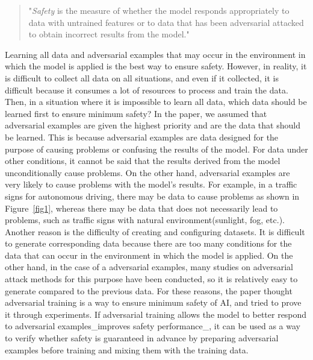 \documentclass[journal,article,submit,moreauthors,pdftex]{Definitions/mdpi}
\begin{document}
\begin{quote}
    "{\it Safety} is the measure of whether the model responds appropriately to data with untrained features or to data that has been adversarial attacked to obtain incorrect results from the model."
\end{quote}

Learning all data and adversarial examples that may occur in the environment in which the model is applied is the best way to ensure safety.
However, in reality, it is difficult to collect all data on all situations, and even if it collected, it is difficult because it consumes a lot of resources to process and train the data.
Then, in a situation where it is impossible to learn all data, which data should be learned first to ensure minimum safety?
In the paper, we assumed that adversarial examples are given the highest priority and are the data that should be learned.
This is because adversarial examples are data designed for the purpose of causing problems or confusing the results of the model.
For data under other conditions, it cannot be said that the results derived from the model unconditionally cause problems.
On the other hand, adversarial examples are very likely to cause problems with the model's results.
For example, in a traffic signs for autonomous driving, there may be data to cause problems as shown in Figure~\ref{fig1}, whereas there may be data that does not necessarily lead to problems, such as traffic signs with natural environment(sunlight, fog, etc.).
Another reason is the difficulty of creating and configuring datasets. It is difficult to generate corresponding data because there are too many conditions for the data that can occur in the environment in which the model is applied.
On the other hand, in the case of a adversarial examples, many studies on adversarial attack methods for this purpose have been conducted, so it is relatively easy to generate compared to the previous data.
For these reasons, the paper thought adversarial training is a way to ensure minimum safety of AI, and tried to prove it through experiments.
If adversarial training allows the model to better respond to adversarial examples\_improves safety performance\_, it can be used as a way to verify whether safety is guaranteed in advance by preparing adversarial examples before training and mixing them with the training data. \\
\end{document}
